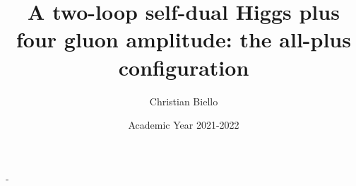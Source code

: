 \documentclass[10.4pt,a4paper,titlepage,oldfontcommands,oneside]{memoir}
\title{A two-loop self-dual Higgs plus four gluon amplitude: the all-plus configuration}
\author{Christian Biello}
\date{Academic Year 2021-2022}
\begin{document}
\frontmatter

\begin{titlingpage}
  \calccentering{\unitlength}
  \begin{adjustwidth*}{\unitlength-24pt}{-\unitlength-24pt}
    \maketitle
  \end{adjustwidth*}
\end{titlingpage}






\cleartorecto
{
\hypersetup{linkcolor=black,linktoc=page}	%
\tableofcontents
}
\mainmatter













%

%
%







\backmatter



\end{document}
